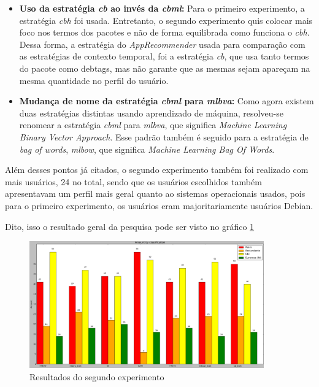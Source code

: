 \begin{itemize}
   \item \textbf{Uso da estratégia \textit{cb} ao invés da \textit{cbml}:} Para
   o primeiro experimento, a estratégia \textit{cbh} foi usada. Entretanto,
   o segundo experimento quis colocar mais foco nos termos dos pacotes e
   não de forma equilibrada como funciona o \textit{cbh}. Dessa forma,
   a estratégia do \textit{AppRecommender} usada para comparação com as
   estratégias de contexto temporal, foi a estratégia \textit{cb}, que usa
   tanto termos do pacote como debtags, mas não garante que as mesmas sejam
   apareçam na mesma quantidade no perfil do usuário.

   \item \textbf{Mudança de nome da estratégia \textit{cbml} para
   \textit{mlbva}:} Como agora existem duas estratégias distintas usando
   aprendizado de máquina, resolveu-se renomear a estratégia \textit{cbml}
   para \textit{mlbva}, que significa \textit{Machine Learning Binary
   Vector Approach}. Esse padrão também é seguido para a estratégia de
   \textit{bag of words}, \textit{mlbow}, que significa \textit{Machine
   Learning Bag Of Words}.
\end{itemize}

Além desses pontos já citados, o segundo experimento também foi realizado com
mais usuários, 24 no total, sendo que os usuários escolhidos também apresentavam
um perfil mais geral quanto ao sistemas operacionais usados, pois para o
primeiro experimento, os usuários eram majoritariamente usuários Debian.

Dito, isso o resultado geral da pesquisa pode ser visto no gráfico
\ref{fig:segundo_experimento}

\begin{figure}[h]
  \centering
  \includegraphics[width=0.9\textwidth]{figuras/segundo_experimento.eps}
  \caption{Resultados do segundo experimento}
  \label{fig:segundo_experimento}
\end{figure}


